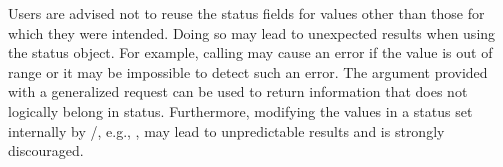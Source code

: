 \begin{users}
Users are advised not to reuse the status fields for values other than
those for which they were intended.  Doing so may lead to unexpected
results when using the status object.  For example, calling
 may cause an error if the value is
out of range or it may be impossible to detect such an error.  The
 argument provided with a generalized request can
be used to return information that does not logically belong in
status.
Furthermore, modifying the values in a status set internally by \MPI/,
e.g., , may lead to unpredictable results and is
strongly discouraged.
\end{users}

